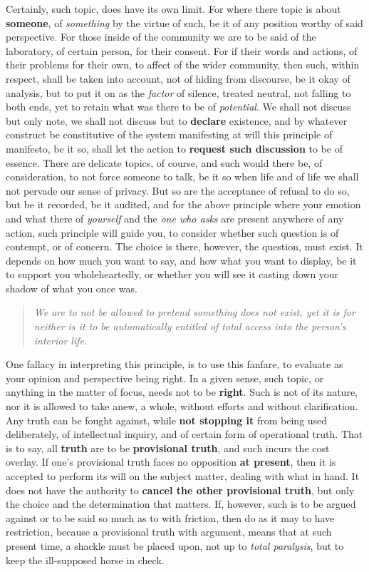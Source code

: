 \documentclass[10pt,a4paper]{article}
\begin{document}
Certainly, such topic, does have its own limit. For where there topic is about \textbf{someone}, of \textit{something} by the virtue of such, be it of any position worthy of said perspective. For those inside of the community we are to be said of the laboratory, of certain person, for their consent. For if their words and actions, of their problems for their own, to affect of the wider community, then such, within respect, shall be taken into account, not of hiding from discourse, be it okay of analysis, but to put it on as the \textit{factor} of silence, treated neutral, not falling to both ends, yet to retain what was there to be of \textit{potential}. We shall not discuss but only note, we shall not discuss but to \textbf{declare} existence, and by whatever construct be constitutive of the system manifesting at will this principle of manifesto, be it so, shall let the action to \textbf{request such discussion} to be of essence. There are delicate topics, of course, and such would there be, of consideration, to not force someone to talk, be it so when life and of life we shall not pervade our sense of privacy. But so are the acceptance of refusal to do so, but be it recorded, be it audited, and for the above principle where your emotion and what there of \textit{yourself} and the \textit{one who asks} are present anywhere of any action, such principle will guide you, to consider whether such question is of contempt, or of concern. The choice is there, however, the question, must exist. It depends on how much you want to say, and how what you want to display, be it to support you wholeheartedly, or whether you will see it casting down your shadow of what you once was. 

\begin{quote}
    \textit{We are to not be allowed to pretend something does not exist, yet it is for neither is it to be automatically entitled of total access into the person's interior life.}
\end{quote}

One fallacy in interpreting this principle, is to use this fanfare, to evaluate as your opinion and perspective being right. In a given sense, such topic, or anything in the matter of focus, needs not to be \textbf{right}. Such is not of its nature, nor it is allowed to take anew, a whole, without efforts and without clarification. Any truth can be fought against, while \textbf{not stopping it} from being used deliberately, of intellectual inquiry, and of certain form of operational truth. That is to say, all \textbf{truth} are to be \textbf{provisional truth}, and such incurs the cost overlay. If one's provisional truth faces no opposition \textbf{at present}, then it is accepted to perform its will on the subject matter, dealing with what in hand. It does not have the authority to \textbf{cancel the other provisional truth}, but only the choice and the determination that matters. If, however, such is to be argued against or to be said so much as to with friction, then do as it may to have restriction, because a provisional truth with argument, means that at such present time, a shackle must be placed upon, not up to \textit{total paralysis}, but to keep the ill-supposed horse in check. 
\end{document}
